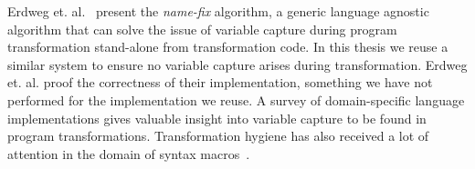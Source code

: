 Erdweg et. al.~\cite{Erdweg2014} present the \textit{name-fix} algorithm, a generic language agnostic algorithm that can solve the issue of variable capture during program transformation stand-alone from transformation code. In this thesis we reuse a similar system to ensure no variable capture arises during transformation. Erdweg et. al. proof the correctness of their implementation, something we have not performed for the implementation we reuse. A survey of domain-specific language implementations gives valuable insight into variable capture to be found in program transformations. Transformation hygiene has also received a lot of attention in the domain of syntax macros~\cite{Kohlbecker1986,Herman2010a,Disney2014}. 
